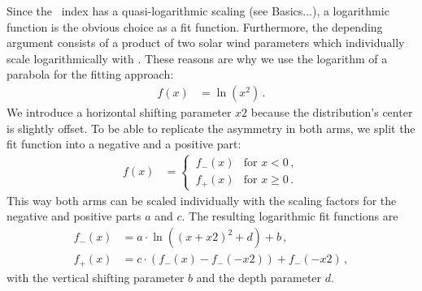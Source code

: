 Since the \Kp~index has a quasi-logarithmic scaling (see Basics...), a logarithmic function is the obvious choice as a fit function. Furthermore, the depending argument consists of a product of two solar wind parameters which individually scale logarithmically with \Kp{}. These reasons are why we use the logarithm of a parabola for the fitting approach:
\begin{align}
	f(x) &= \ln(x^2)	\,.	\label{eq:log_square_function}
\end{align}
We introduce a horizontal shifting parameter $x2$ because the distribution's center is slightly offset. To be able to replicate the asymmetry in both arms, we split the fit function into a negative and a positive part:
\begin{align}
	f(x) &=
	\begin{cases}
		\,f_-(x) &\text{for } x < 0	\,,\\
		\,f_+(x) &\text{for } x \ge 0	\,.
	\end{cases}	\label{eq:log_square_fit_function}
\end{align}
This way both arms can be scaled individually with the scaling factors for the negative and positive parts $a$ and $c$. The resulting logarithmic fit functions are
\begin{align}
	f_-(x) &= a \cdot \ln((x + x2)^2 + d) + b	\,,\\
	f_+(x) &= c \cdot (f_-(x) - f_-(-x2)) + f_-(-x2)	\,,
\end{align}
with the vertical shifting parameter $b$ and the depth parameter $d$.\\


